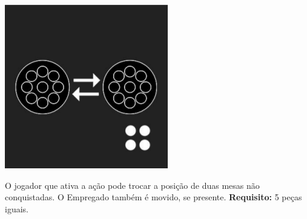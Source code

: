 \documentclass[a4paper]{article}
\begin{document}
\begin{minipage}[t]{0.1\textwidth}
\includegraphics[scale=0.25]{swap-claimed.png}
\end{minipage}
\begin{minipage}[t]{0.3\textwidth}
O jogador que ativa a ação pode trocar a posição de duas mesas não conquistadas. O Empregado também é movido, se presente. \textbf{Requisito:} 5 peças iguais.
\end{minipage}
\end{document}
